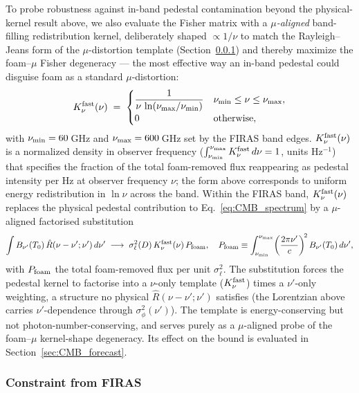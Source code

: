 \documentclass[aps,prd,onecolumn,amsmath,amssymb]{revtex4-2}
\begin{document}
To probe robustness against in-band pedestal contamination beyond
the physical-kernel result above, we also evaluate the Fisher matrix
with a \emph{$\mu$-aligned} band-filling redistribution kernel,
deliberately shaped $\propto 1/\nu$ to match the Rayleigh--Jeans form
of the $\mu$-distortion template (Section~\ref{sec:CMB_degeneracy}) and
thereby maximize the foam--$\mu$ Fisher degeneracy --- the most
effective way an in-band pedestal could disguise foam as a standard
$\mu$-distortion:
\begin{equation}
  K_\nu^{\rm fast}(\nu) \;=\;
  \begin{cases}
    \dfrac{1}{\nu\,\ln(\nu_{\rm max}/\nu_{\rm min})} &
    \nu_{\rm min}\le\nu\le\nu_{\rm max},\\[4pt]
    0 & \text{otherwise},
  \end{cases}
  \label{eq:Knufast}
\end{equation}
with $\nu_{\rm min}=60$\,GHz and $\nu_{\rm max}=600$\,GHz set by the
FIRAS band edges.  $K_\nu^{\rm fast}(\nu)$ is a normalized density
in observer frequency ($\int_{\nu_{\rm min}}^{\nu_{\rm max}}
K_\nu^{\rm fast}\,d\nu=1$, units Hz$^{-1}$) that specifies the
fraction of the total foam-removed flux reappearing as pedestal
intensity per Hz at observer frequency $\nu$; the form above
corresponds to uniform energy redistribution in $\ln\nu$ across the
band.  Within the FIRAS band, $K_\nu^{\rm fast}(\nu)$ replaces the
physical pedestal contribution to Eq.~\eqref{eq:CMB_spectrum} by a
$\mu$-aligned factorised substitution
\begin{equation}
  \int B_{\nu'}(T_0)\,\hat{R}(\nu-\nu';\nu')\,d\nu'
    \;\longrightarrow\;
    \sigma_\ell^2(D)\,K_\nu^{\rm fast}(\nu)\,P_{\rm foam},
  \quad
  P_{\rm foam} \equiv \int_{\nu_{\rm min}}^{\nu_{\rm max}}
    \!\left(\frac{2\pi\nu'}{c}\right)^{\!2} B_{\nu'}(T_0)\,d\nu',
  \label{eq:Kfast_pedestal}
\end{equation}
with $P_{\rm foam}$ the total foam-removed flux per unit
$\sigma_\ell^2$.  The substitution forces the pedestal kernel to
factorise into a $\nu$-only template ($K_\nu^{\rm fast}$) times a
$\nu'$-only weighting, a structure no physical
$\hat{R}(\nu-\nu';\nu')$ satisfies (the Lorentzian above carries
$\nu'$-dependence through $\sigma_\phi^2(\nu')$).  The template is
energy-conserving but not photon-number-conserving, and serves purely
as a $\mu$-aligned probe of the foam--$\mu$ kernel-shape degeneracy.
Its effect on the bound is evaluated in Section~\ref{sec:CMB_forecast}.

\subsubsection{Constraint from FIRAS}
\label{sec:CMB_degeneracy}
\end{document}
